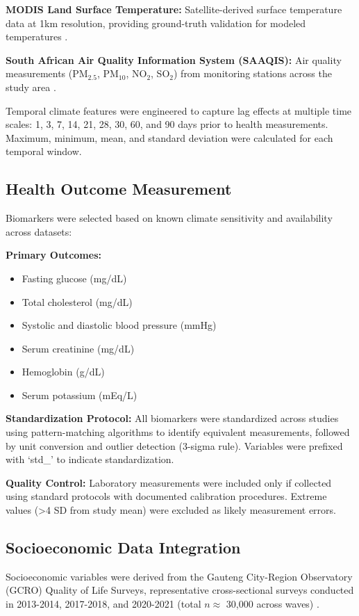 \documentclass[11pt,a4paper]{article}
\begin{document}
\textbf{MODIS Land Surface Temperature:} Satellite-derived surface temperature data at 1km resolution, providing ground-truth validation for modeled temperatures \cite{wan2015mod11a1}.

\textbf{South African Air Quality Information System (SAAQIS):} Air quality measurements (PM$_{2.5}$, PM$_{10}$, NO$_2$, SO$_2$) from monitoring stations across the study area \cite{saaqis2020}.

Temporal climate features were engineered to capture lag effects at multiple time scales: 1, 3, 7, 14, 21, 28, 30, 60, and 90 days prior to health measurements. Maximum, minimum, mean, and standard deviation were calculated for each temporal window.

\subsection{Health Outcome Measurement}

Biomarkers were selected based on known climate sensitivity and availability across datasets:

\textbf{Primary Outcomes:}
\begin{itemize}
\item Fasting glucose (mg/dL)
\item Total cholesterol (mg/dL)
\item Systolic and diastolic blood pressure (mmHg)
\item Serum creatinine (mg/dL)
\item Hemoglobin (g/dL)
\item Serum potassium (mEq/L)
\end{itemize}

\textbf{Standardization Protocol:} All biomarkers were standardized across studies using pattern-matching algorithms to identify equivalent measurements, followed by unit conversion and outlier detection (3-sigma rule). Variables were prefixed with `std\_' to indicate standardization.

\textbf{Quality Control:} Laboratory measurements were included only if collected using standard protocols with documented calibration procedures. Extreme values (>4 SD from study mean) were excluded as likely measurement errors.

\subsection{Socioeconomic Data Integration}

Socioeconomic variables were derived from the Gauteng City-Region Observatory (GCRO) Quality of Life Surveys, representative cross-sectional surveys conducted in 2013-2014, 2017-2018, and 2020-2021 (total $n \approx$ 30,000 across waves) \cite{gcro2020qol}.
\end{document}
